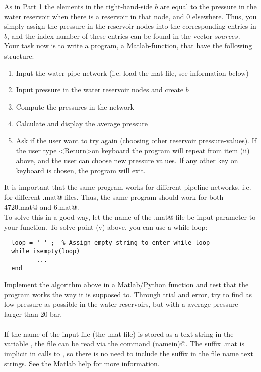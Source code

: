 \documentclass[11pt,a4paper]{article}
\begin{document}
As in Part 1 the elements in the right-hand-side $b$ are equal to the pressure in the water reservoir when there is a reservoir in that node, and 0 elsewhere. Thus, you simply assign the pressure in the reservoir nodes into the corresponding entries in $b$, and the index number of these entries can be found in the vector $sources$. 
\\
Your task now is to write a program, a Matlab-function, that have the following structure:
\begin{enumerate}[label=(\roman*)]
\item Input the  water pipe network (i.e. load the mat-file, see information below)
\item Input pressure in the water reservoir nodes and create $b$
\item Compute the pressures in the network
\item Calculate and display the average pressure
\item Ask if the user want to try again (choosing other reservoir pressure-values). If the user type \textless Return\textgreater \thinspace on keyboard the program will repeat from item (ii) above,  and the user can choose new pressure values. If any other key on keyboard is chosen, the program will exit. 
\end{enumerate}
It is important that the same program works for different pipeline networks, i.e. for different \verb@.mat@-files. Thus, the same program should work for both \verb@water4720.mat@ and \verb@water6.mat@. \\
To solve this in a good way, let the name of the \verb@.mat@-file be input-parameter to your function. To solve point (v) above, you can use a while-loop:
\begin{verbatim}
  loop = ' ' ;  % Assign empty string to enter while-loop
  while isempty(loop)
         ...
  end
\end{verbatim} 

\noindent Implement the algorithm above in a Matlab/Python function and test that the program works the way it is supposed to. Through trial and error, try to find as low pressure as possible in the water reservoirs, but with a average pressure larger than 20 bar. \\

\medskip
{}\\
If the name of the input file (the .mat-file) is stored as a text string in the variable \verb@namein@, the file can be read via the command \verb@load(namein)@. The suffix .mat is implicit in calls to \verb@load@, so there is no need to include the suffix in the file name text strings. See the Matlab help for more information.
\end{document}
